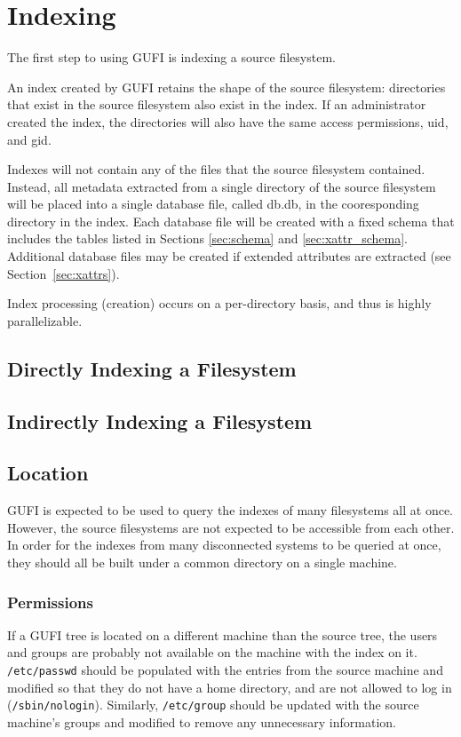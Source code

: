 \section{Indexing}
The first step to using GUFI is indexing a source filesystem.

An index created by GUFI retains the shape of the source filesystem:
directories that exist in the source filesystem also exist in the
index. If an administrator created the index, the directories will
also have the same access permissions, uid, and gid.

Indexes will not contain any of the files that the source filesystem
contained. Instead, all metadata extracted from a single directory of
the source filesystem will be placed into a single database file,
called db.db, in the cooresponding directory in the index. Each
database file will be created with a fixed schema that includes the
tables listed in Sections \ref{sec:schema} and
\ref{sec:xattr_schema}. Additional database files may be created if
extended attributes are extracted (see Section~\ref{sec:xattrs}).

Index processing (creation) occurs on a per-directory basis, and thus
is highly parallelizable.

\subsection{Directly Indexing a Filesystem}

\subsection{Indirectly Indexing a Filesystem}






\subsection{Location}
GUFI is expected to be used to query the indexes of many filesystems
all at once. However, the source filesystems are not expected to be
accessible from each other. In order for the indexes from many
disconnected systems to be queried at once, they should all be built
under a common directory on a single machine.

\subsubsection{Permissions}
If a GUFI tree is located on a different machine than the source
tree, the users and groups are probably not available on the machine
with the index on it. \texttt{/etc/passwd} should be populated with
the entries from the source machine and modified so that they do not
have a home directory, and are not allowed to log in
(\texttt{/sbin/nologin}). Similarly, \texttt{/etc/group} should be
updated with the source machine's groups and modified to remove any
unnecessary information.
